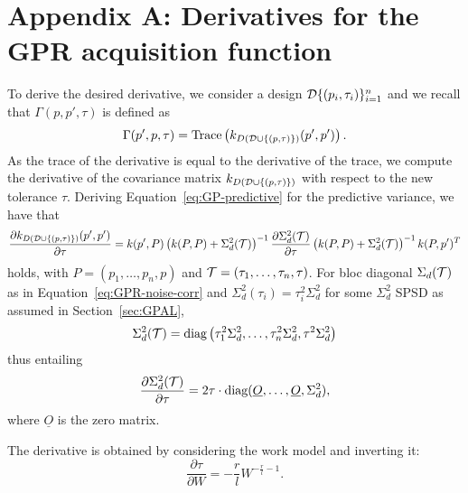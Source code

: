 \section{Appendix A: Derivatives for the GPR acquisition function}\label{app:derivatives} 

To derive the desired derivative, we consider a design $\mathcal D\{(p_i, \tau_i)\}_{i=1}^n$ and we recall that $\Gamma(p,p',\tau)$ is defined as
\[
    \Gamma(p', p, \tau) = \text{Trace} \left( k_{D(\mathcal D \cup \{(p, \tau)\}) }(p',p') \right).
\]
As the trace of the derivative is equal to the derivative of the trace, we compute the derivative of the covariance matrix $ k_{D(\mathcal D \cup \{(p, \tau)\}) }$ with respect to the new tolerance $\tau$.
Deriving Equation~\eqref{eq:GP-predictive} for the predictive variance, we have that 
\[
    \frac{\partial k_{D(\mathcal D \cup \{(p, \tau)\}) }(p',p')}{\partial \tau} = k(p', P) \left(k(P,P) + \Sigma_d^2(\mathcal T) \right)^{-1}\frac{\partial \Sigma_d^2(\mathcal T)}{\partial \tau}  \left(k(P,P) + \Sigma_d^2(\mathcal T) \right)^{-1} k(P, p')^T
\]
holds, with $P=(p_1,\dots,p_n, p)$ and $\mathcal T = (\tau_1, \dots, \tau_n,\tau)$.
For bloc diagonal $\Sigma_d(\mathcal T)$ as in Equation~\eqref{eq:GPR-noise-corr} and $\Sigma_d^2(\tau_i)=\tau_i^2 \Sigma_d^2$ for some $\Sigma_d^2$ SPSD as assumed in Section~\ref{sec:GPAL},
\[
    \Sigma_d^2(\mathcal T) = \text{diag}\left(\tau_1^2\Sigma_d^2, \ldots, \tau_n^2 \Sigma_d^2, \tau^2 \Sigma_d^2\right) 
\]  
thus entailing
\[
    \frac{\partial \Sigma_d^2(\mathcal T)}{\partial \tau} = 2\tau \cdot \text{diag}(\underline O, \ldots,  \underline O, \Sigma_d^2),
\]
where $\underline O$ is the zero matrix.

The derivative is obtained by considering the work model and inverting it:
\[
\frac{\partial \tau}{\partial W} = -\frac{r}{l} W^{-\frac{r}{l}-1}.
\]
